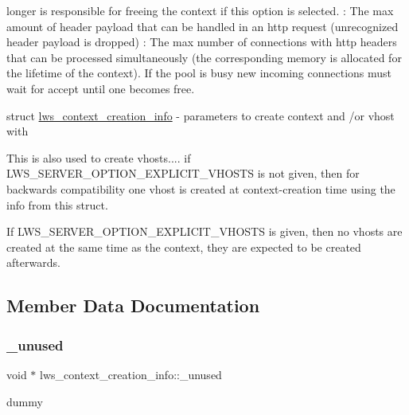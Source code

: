 longer is responsible for freeing the context if this option is selected. \+: The max amount of header payload that can be handled in an http request (unrecognized header payload is dropped) \+: The max number of connections with http headers that can be processed simultaneously (the corresponding memory is allocated for the lifetime of the context). If the pool is busy new incoming connections must wait for accept until one becomes free.

struct \hyperlink{structlws__context__creation__info}{lws\+\_\+context\+\_\+creation\+\_\+info} -\/ parameters to create context and /or vhost with

This is also used to create vhosts.... if L\+W\+S\+\_\+\+S\+E\+R\+V\+E\+R\+\_\+\+O\+P\+T\+I\+O\+N\+\_\+\+E\+X\+P\+L\+I\+C\+I\+T\+\_\+\+V\+H\+O\+S\+TS is not given, then for backwards compatibility one vhost is created at context-\/creation time using the info from this struct.

If L\+W\+S\+\_\+\+S\+E\+R\+V\+E\+R\+\_\+\+O\+P\+T\+I\+O\+N\+\_\+\+E\+X\+P\+L\+I\+C\+I\+T\+\_\+\+V\+H\+O\+S\+TS is given, then no vhosts are created at the same time as the context, they are expected to be created afterwards. 

\subsection{Member Data Documentation}
\mbox{\label{structlws__context__creation__info_aaae1af38a410556cc5db05e4973e8d27}} 
\subsubsection{\texorpdfstring{\+\_\+unused}{\_unused}}
{\footnotesize\ttfamily void $\ast$ lws\+\_\+context\+\_\+creation\+\_\+info\+::\+\_\+unused}

dummy \mbox{\label{structlws__context__creation__info_a12b0f0e624463ec02492b009dea7a216}} 
